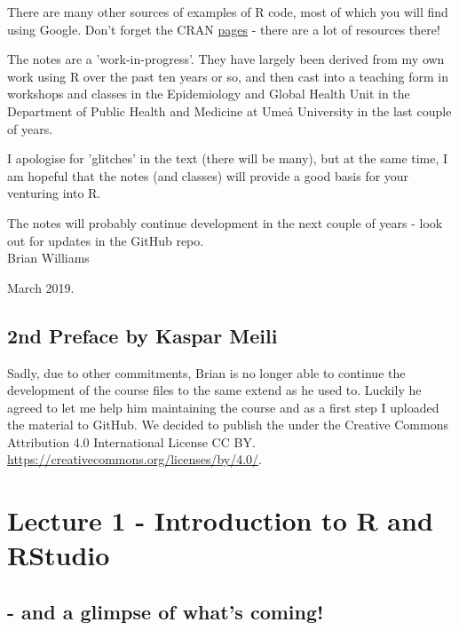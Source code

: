 \documentclass[titlepage]{book}\usepackage{knitr}
\begin{document}
There are many other sources of examples of R code, most of which you will find using Google. Don't forget the CRAN \href{https://cran.r-project.org/}{pages} - there are a lot of resources there! 

The notes are a 'work-in-progress'.  They have largely been derived from my own work using R over the past ten years or so, and then cast into a teaching form in workshops and classes in the Epidemiology and Global Health Unit in the Department of Public Health and Medicine at Umeå University in the last couple of years.

I apologise for 'glitches' in the text (there will be many), but at the same time, I am hopeful that the notes (and classes) will provide a good basis for your venturing into R.

The notes will probably continue development in the next couple of years - look out for updates in the GitHub repo. \\


Brian Williams
 
 
March 2019.


\section{2nd Preface by Kaspar Meili}

Sadly, due to other commitments, Brian is no longer able to continue the development of the course files to the same extend as he used to. Luckily he agreed to let me help him maintaining the course and as a first step I uploaded the material to GitHub. We decided to publish the under the Creative Commons Attribution 4.0 International License CC BY. \url{https://creativecommons.org/licenses/by/4.0/}. 

\cleardoublepage
{}
{}
\tableofcontents
\cleardoublepage
\mainmatter






\chapter{Lecture 1 - Introduction to R and RStudio }\label{L1}
\section*{- and a glimpse of what's coming!}

\author{Brian Williams $<$\href{mailto:bjw649@gmail.com}%
{bjw649@gmail.com}$>$}
\end{document}
